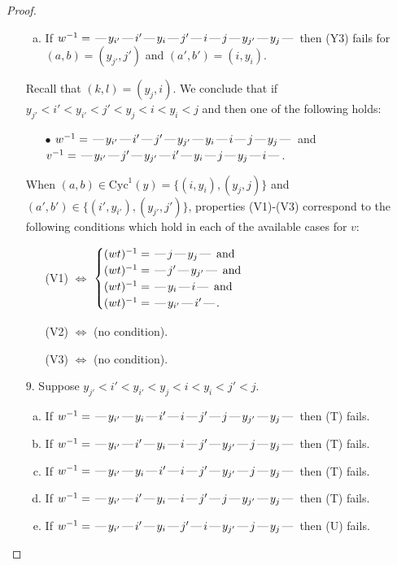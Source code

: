 \documentclass[10pt]{article}
\theoremstyle{definition}
\theoremstyle{definition}
\def\dash{\text{\hspace{0.5mm}---\hspace{0.5mm}}}
\def\Cyc{\mathrm{Cyc}}
\begin{document}
\begin{proof}
\begin{enumerate}
\begin{enumerate}[(a)]
\item If $w^{-1} = \dash y_{i'}\dash i'\dash y_i\dash j'\dash i\dash j\dash y_{j'}\dash y_j\dash $ then (Y3) fails for $(a,b)=(y_{j'},j')$ and $(a',b')=(i,y_i)$.
\end{enumerate}
Recall that $(k,l) = (y_j,i)$.
We conclude that if $y_{j'} < i' < y_{i'} < j' < y_j < i < y_i < j$ and then one of the following holds:
\begin{enumerate}
\item[$\bullet$] $w^{-1} = \dash y_{i'}\dash i'\dash j'\dash y_{j'}\dash y_i\dash i\dash j\dash y_j\dash $ and $v^{-1} = \dash y_{i'}\dash j'\dash y_{j'}\dash i'\dash y_i\dash j\dash y_j\dash i\dash $.
\end{enumerate}
When $(a,b)\in\Cyc^1(y)=\{(i,y_i),(y_j,j)\}$ and $(a',b')\in\{(i',y_{i'}),(y_{j'},j')\}$,
properties (V1)-(V3) correspond to the following conditions which hold in
each of the available cases for $v$:
\begin{enumerate}
\item[](V1) $\Leftrightarrow$ $\begin{cases}\text{$(wt)^{-1} = \dash j \dash y_j \dash$}\text{ and }\\
\text{$(wt)^{-1} = \dash j' \dash y_{j'} \dash$}\text{ and }\\
\text{$(wt)^{-1} = \dash y_i \dash i \dash$}\text{ and }\\
\text{$(wt)^{-1} = \dash y_{i'} \dash i' \dash$}.\end{cases}$
\item[](V2) $\Leftrightarrow$ (no condition).
\item[](V3) $\Leftrightarrow$ (no condition).
\end{enumerate}
\item[$9$.] Suppose $y_{j'} < i' < y_{i'} < y_j < i < y_i < j' < j$.
\begin{enumerate}[(a)]
\item If $w^{-1} = \dash y_{i'}\dash y_i\dash i'\dash i\dash j'\dash j\dash y_{j'}\dash y_j\dash $ then (T) fails.
\item If $w^{-1} = \dash y_{i'}\dash i'\dash y_i\dash i\dash j'\dash y_{j'}\dash j\dash y_j\dash $ then (T) fails.
\item If $w^{-1} = \dash y_{i'}\dash y_i\dash i'\dash i\dash j'\dash y_{j'}\dash j\dash y_j\dash $ then (T) fails.
\item If $w^{-1} = \dash y_{i'}\dash i'\dash y_i\dash i\dash j'\dash j\dash y_{j'}\dash y_j\dash $ then (T) fails.
\item If $w^{-1} = \dash y_{i'}\dash i'\dash y_i\dash j'\dash i\dash y_{j'}\dash j\dash y_j\dash $ then (U) fails.

\end{enumerate}
\end{enumerate}
\end{proof}
\end{document}
